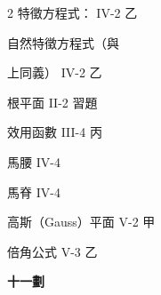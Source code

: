 \begin{multicols}{2}
\noindent 特徵方程式： \hfill IV-2 乙\par
\noindent\hspace*{1.5em} 自然特徵方程式（與\par
\noindent\hspace*{1.5em} 上同義） \hfill IV-2 乙\par
\noindent 根平面 \hfill II-2 習題\par
\noindent 效用函數 \hfill III-4 丙\par
\noindent 馬腰 \hfill IV-4\par
\noindent 馬脊 \hfill IV-4\par
\noindent 高斯（Gauss）平面 \hfill V-2 甲\par
\noindent 倍角公式 \hfill V-3 乙\par

\vspace{0.8em}
\begin{center}
\textbf{\large 十一劃}
\end{center}


\end{multicols}
